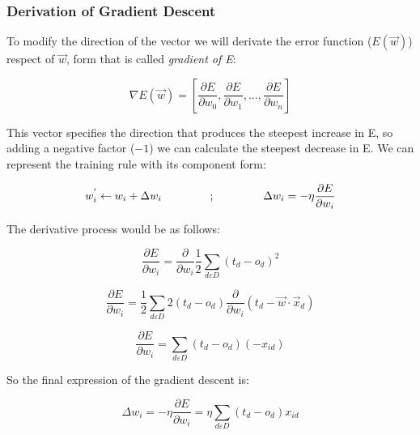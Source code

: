 \documentclass{article}
\begin{document}
	\subsubsection{Derivation of Gradient Descent}
	To modify the direction of the vector we will derivate the error function ($E(\vec{w})$) respect of $\vec{w}$, form that is called \textit{gradient of E}:

	\begin{equation}
		\label{gradient_of_E}
		\nabla E(\vec{w})= [\frac{\partial{E}}{\partial{w_{0}}}, \frac{\partial{E}}{\partial{w_{1}}}, ..., \frac{\partial{E}}{\partial{w_{n}}}]
	\end{equation}

	This vector specifies the direction that produces the steepest increase in E, so adding a negative factor ($-1$) we can calculate the steepest decrease in E. We can represent the training rule with its component form:

	\begin{equation}
		\label{training_rule_component_form}
		w_{i}^{'} \leftarrow w_{i} + \Delta w_{i} \hspace{1.5cm} ; \hspace{1.5cm} \Delta{w_{i}}=-\eta \frac{\partial{E}}{\partial{w_i}}
	\end{equation}

	The derivative process would be as follows:

	\begin{equation}
		\label{derivating_error_function_1}
		\frac{\partial{E}}{\partial{w_i}} = \frac{\partial{}}{\partial{w_i}} \frac{1}{2} \sum_{d \varepsilon D} (t_d - o_d)^2
	\end{equation}

	\begin{equation}
		\label{derivating_error_function_2}
		\frac{\partial{E}}{\partial{w_i}}  = \frac{1}{2} \sum_{d \varepsilon D} 2(t_d - o_d) \frac{\partial{}}{\partial{w_i}} (t_d - \vec{w} \cdot \vec{x}_d)
	\end{equation}

	\begin{equation}
		\label{derivating_error_function_3}
		\frac{\partial{E}}{\partial{w_i}} = \sum_{d \varepsilon D} (t_d - o_d) (-x_{id})
	\end{equation}

	So the final expression of the gradient descent is:

	\begin{equation}
		\label{gradient_descent_final_expr}
		\Delta w_i = -\eta \frac{\partial{E}}{\partial{w_i}} = \eta \sum_{d \varepsilon D} (t_d - o_d) x_{id}
	\end{equation}
\end{document}
